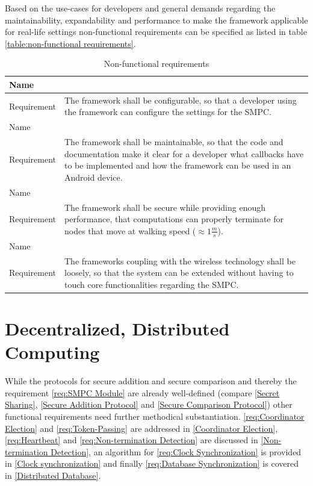 	Based on the use-cases for developers and general demands regarding the maintainability, expandability and performance to make the framework applicable for real-life settings non-functional requirements can be specified as listed in table \ref{table:non-functional requirements}.

	\begin{table}[!htb] %
		\centering
		\caption{Non-functional requirements} \label{table:non-functional requirements}
		\begin{tabular}{|l|p{}|}
			\toprule
		Name & \nonfuncreq{Usability}\label{req:Usability} \\ \midrule
		Requirement & The framework shall be configurable, so that a developer using the framework can configure the settings for the \gls{SMPC}. \\ \midrule
		Name & \nonfuncreq{Maintainability}\label{req:Supportability} \\ \midrule
		Requirement & The framework shall be maintainable, so that the code and documentation make it clear for a developer what callbacks have to be implemented and how the framework can be used in an Android device. \\ \midrule
		Name & \nonfuncreq{Performance}\label{req:Performance} \\ \midrule
		Requirement & The framework shall be secure while providing enough performance, that computations can properly terminate for nodes that move at walking speed ($\approx1\frac{m}{s}$). \\ \midrule
		Name & \nonfuncreq{Expandability}\label{req:Expandability} \\ \midrule
		Requirement & The frameworks coupling with the wireless technology shall be loosely, so that the system can be extended without having to touch core functionalities regarding the \gls{SMPC}.  \\ \bottomrule
		\end{tabular}
	\end{table}
		
	\FloatBarrier
	
	\section{Decentralized, Distributed Computing} \label{Decentralized, Distributed Computing}
	
		While the protocols for secure addition and secure comparison and thereby the requirement \ref{req:SMPC Module} are already well-defined (compare \ref{Secret Sharing}, \ref{Secure Addition Protocol} and \ref{Secure Comparison Protocol}) other functional requirements need further methodical substantiation. \ref{req:Coordinator Election} and \ref{req:Token-Passing} are addressed in \ref{Coordinator Election}, \ref{req:Heartbeat} and \ref{req:Non-termination Detection} are discussed in \ref{Non-termination Detection}, an algorithm for \ref{req:Clock Synchronization} is provided in \ref{Clock synchronization} and finally \ref{req:Database Synchronization} is covered in \ref{Distributed Database}.

